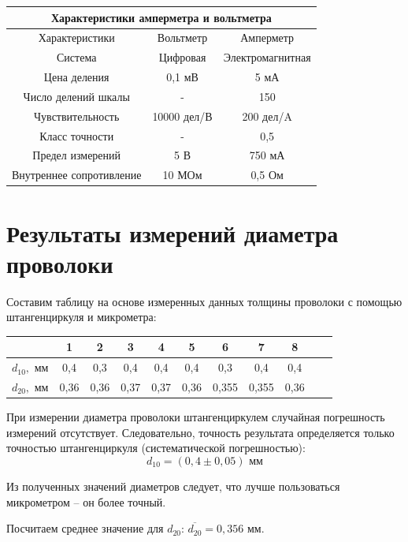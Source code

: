 \documentclass[a4paper, 12pt]{article} %
\begin{document}
\begin{center}
\begin{tabular}{|c|c|c|}
\hline 
\multicolumn{3}{|c|}{Характеристики амперметра и вольтметра} \\ 
\hline 
Характеристики & Вольтметр & Амперметр \\ 
\hline 
Система & Цифровая & Электромагнитная \\ 
\hline 
Цена деления & 0,1 мВ & 5 мА \\ 
\hline 
Число делений шкалы & - & 150 \\ 
\hline 
Чувствительность & 10000 дел/В & 200 дел/A \\ 
\hline 
Класс точности & - & 0,5 \\ 
\hline 
Предел измерений & 5 В & 750 мА \\ 
\hline 
Внутреннее сопротивление & 10 МОм & 0,5 Ом \\ 
\hline  
\end{tabular} 
\end{center} 
\newpage

\section{Результаты измерений диаметра проволоки}


Составим таблицу на основе измеренных данных толщины проволоки с помощью штангенциркуля и микрометра:

\begin{center}
\begin{tabular}{|c|c|c|c|c|c|c|c|c|c|c|}
\hline 
 & 1 & 2 & 3 & 4 & 5 & 6 & 7 & 8  \\ 
\hline 
$d_{10},$ мм & 0,4 & 0,3 & 0,4 & 0,4 & 0,4 & 0,3 & 0,4 & 0,4\\ 
\hline 
$d_{20},$ мм & 0,36 & 0,36 & 0,37 & 0,37 & 0,36 & 0,355 & 0,355 & 0,36\\ 
\hline 
\end{tabular} 
\end{center}

При измерении диаметра проволоки штангенциркулем случайная погрешность измерений отсутствует. Следовательно, точность результата определяется только точностью штангенциркуля (систематической погрешностью):
\[d_{10} = (0,4 \pm 0,05) \text{ мм}\]

Из полученных значений диаметров следует, что лучше пользоваться микрометром -- он более точный.

Посчитаем среднее значение для $d_{20}$: $\overline{d_{20}} = 0,356$ мм.
\end{document}
